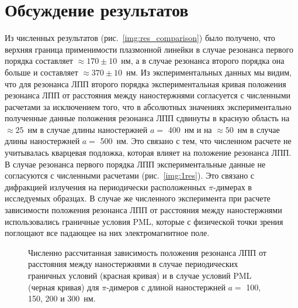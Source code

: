 \section{Обсуждение результатов}

Из численных результатов (рис.~\ref{img:res_comparison}) было получено, что верхняя граница применимости плазмонной линейки в случае резонанса первого порядка составляет $ \approx 170 \pm 10 $~нм, а в случае резонанса второго порядка она больше и составляет $ \approx 370 \pm 10 $~нм. Из экспериментальных данных мы видим, что для резонанса ЛПП второго порядка экспериментальная кривая положения резонанса ЛПП от расстояния между наностержнями согласуется с численными расчетами за исключением того, что в абсолютных значениях экспериментально полученные данные положения резонанса ЛПП сдвинуты в красную область на  $ \approx 25 $~нм в случае длины наностержней $ a = $ 400~нм и на $ \approx 50 $~нм в случае длины наностержней $ a = $ 500~нм. Это связано с тем, что численном расчете не учитывалась кварцевая подложка, которая влияет на положение резонанса ЛПП. В случае резонанса первого порядка ЛПП экспериментальные данные не согласуются с численными расчетами (рис.~\ref{img:1res}). Это связано с дифракцией излучения на периодически расположенных $ \pi $-димерах в исследуемых образцах. В случае же численного эксперимента при расчете зависимости положения резонанса ЛПП от расстояния между наностержнями использовались граничные условия PML, которые с физической точки зрения поглощают все падающее на них электромагнитное поле.
\begin{figure}
\caption{Численно рассчитанная зависимость положения резонанса ЛПП от расстояния между наностержнями в случае периодических граничных условий (красная кривая) и в случае условий PML (черная кривая) для $ \pi $-димеров с длиной наностержней $ a = $ 100, 150, 200 и 300~нм.}
\label{img:res_PML_periodic}
\end{figure}
